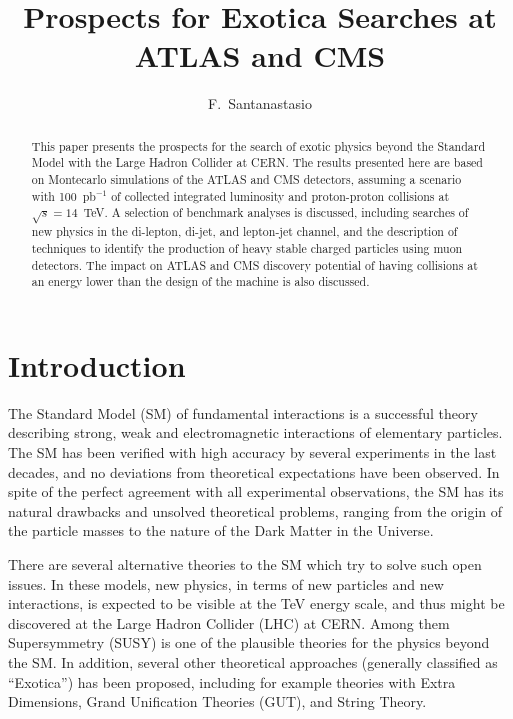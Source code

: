 \documentclass{cimento}
\title{Prospects for Exotica Searches at ATLAS and CMS}
\author{F.~Santanastasio\from{ins:UMD}\ETC
}
\begin{document}
\maketitle

\begin{abstract}
This paper presents the prospects for the search of exotic physics 
beyond the Standard Model with the Large Hadron Collider at CERN. 
The results presented here are based on Montecarlo simulations of the
ATLAS and CMS detectors, assuming a scenario with 
100~pb$^{-1}$ of collected integrated luminosity and proton-proton collisions 
at $\sqrt{s} = 14$~TeV. A selection of benchmark analyses is discussed, 
including searches of new physics in the di-lepton, di-jet, and lepton-jet channel, 
and the description of techniques to identify the production of 
heavy stable charged particles using muon detectors. 
The impact on ATLAS and CMS discovery potential 
of having collisions at an energy lower than the design of the machine 
is also discussed.
\end{abstract}

\section{Introduction}
The Standard Model (SM) of fundamental interactions is a successful theory 
describing strong, weak and electromagnetic interactions of elementary 
particles. The SM has been verified with high accuracy by several experiments 
in the last decades, and no deviations from theoretical expectations 
have been observed. In spite of the perfect agreement with all experimental 
observations, the SM has its natural drawbacks and unsolved theoretical 
problems, ranging from the origin of the particle masses to the nature of the 
Dark Matter in the Universe.

There are several alternative theories to the SM which try to solve such 
open issues. In these models, new physics, in terms of new particles and 
new interactions, is expected to be visible at the TeV energy scale, and 
thus might be discovered at the Large Hadron Collider (LHC) at CERN.
Among them Supersymmetry (SUSY) is one of the plausible theories for the physics 
beyond the SM. In addition, several other theoretical approaches (generally classified 
as ``Exotica'') has been proposed, including for example theories with Extra Dimensions, 
Grand Unification Theories (GUT), and String Theory. 
\end{document}
